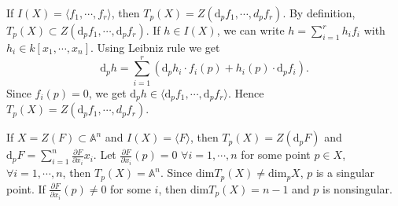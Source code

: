 \begin{remark}
	If $ I(X)=\langle f_1,\cdots,f_r\rangle $, then $ T_p(X)=Z(\mathrm{d}_pf_1,\cdots,d_p f_r) $. By definition, $ T_p(X)\subset Z(\mathrm{d}_pf_1,\cdots,\mathrm{d}_pf_r) $. If $ h\in I(X) $, we can write $ h=\sum\limits_{i=1}^{r}h_if_i $ with $ h_i\in k[x_1,\cdots,x_n] $.  Using Leibniz rule we get
	$$
		\mathrm{d}_p h=\sum\limits_{i=1}^{r}(\mathrm{d}_ph_i\cdot f_i(p)+h_i(p)\cdot \mathrm{d}_pf_i).
	$$
	Since $ f_i(p)=0 $, we get $ \mathrm{d}_p h \in \langle \mathrm{d}_pf_1,\cdots,\mathrm{d}_pf_r \rangle $. Hence $ T_p(X)=Z(\mathrm{d}_pf_1,\cdots,d_p f_r)  $.
\end{remark}
\begin{example}
	If $ X=Z(F) \subset \mathbb{A}^n$ and $ I(X)=\langle F \rangle $, then $ T_p(X)=Z(\mathrm{d}_pF) $ and $ \mathrm{d}_pF=\sum\limits_{i=1}^{n}\frac{\partial F}{\partial x_i}x_i $. Let $ \frac{\partial F}{\partial x_i}(p)=0 $ $ \forall i=1,\cdots,n $ for some point $ p\in X $, $ \forall i=1,\cdots,n $, then $ T_p(X)=\mathbb{A}^n $. Since $ \mathrm{dim}T_p(X)\neq \mathrm{dim}_pX $, $ p $ is a singular point. If $ \frac{\partial F}{\partial x_i}(p)\neq 0 $ for some $ i $, then $ \mathrm{dim}T_p(X)=n-1 $ and $ p $ is nonsingular.
\end{example}

